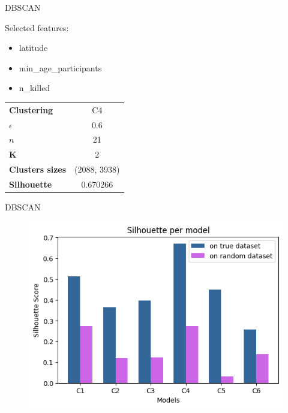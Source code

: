 
\begin{frame}{DBSCAN}

    \begin{exampleblock}{Selected features:}
        \begin{itemize}
            \item latitude
            \item min\_age\_participants
            \item n\_killed
        \end{itemize}
           
    \end{exampleblock}
    
    \begin{table}[]
        \centering
        \begin{tabular}{|lc|}
            \hline
              \textbf{Clustering}  & C4 \\
              $\epsilon$  & 0.6 \\
              $n$ & 21 \\
              \textbf{K} & 2\\
              \textbf{Clusters sizes} & (2088, 3938) \\
              \textbf{Silhouette} & 0.670266 \\
              \hline
        \end{tabular}
        \label{tab:my_label}
    \end{table}
\end{frame}


\begin{frame}{DBSCAN}
    \begin{figure}
    \centering
    \includegraphics[width=.99\textwidth]{img/clustering/dbscan.png}
    \label{dbscan}
\end{figure}
\end{frame}

